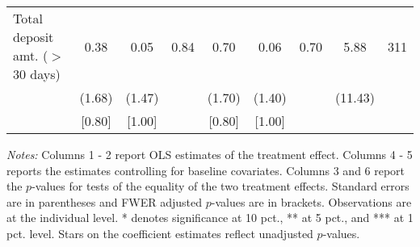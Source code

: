 \begin{table}[h]
{\begin{threeparttable}
\begin{tabular}{l*{8}{c}}
Total deposit amt. ($>$ 30 days)&     0.38&     0.05&     0.84&     0.70&     0.06&     0.70&     5.88&      311\\
          &   (1.68)&   (1.47)&         &   (1.70)&   (1.40)&         &  (11.43)&         \\
          &   [0.80]&   [1.00]&         &   [0.80]&   [1.00]&         &         &         \\
\bottomrule \end{tabular} \begin{tablenotes}[flushleft] \footnotesize \item \emph{Notes:} Columns 1 - 2 report OLS estimates of the treatment effect. Columns 4 - 5 reports the estimates controlling for baseline covariates. Columns 3 and 6 report the \(p\)-values for tests of the equality of the two treatment effects. Standard errors are in parentheses and FWER adjusted \(p\)-values are in brackets. Observations are at the individual level. * denotes significance at 10 pct., ** at 5 pct., and *** at 1 pct. level. Stars on the coefficient estimates reflect unadjusted \(p\)-values. \end{tablenotes} \end{threeparttable} } \end{table}

